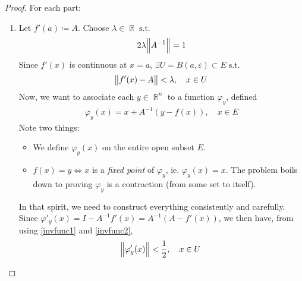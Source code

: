 \documentclass{amsart} %
\theoremstyle{mytheoremstyle}
\theoremstyle{definition}
\numberwithin{equation}{section}
\DeclareMathOperator{\R}{\mathbb{R}}
\DeclareMathOperator{\1}{\mathbbm{1}}
\DeclareMathOperator{\suchthat}{\text{ s.t. }}
\begin{document}
\begin{proof}
	For each part:
	\begin{enumerate}[label=(\arabic*)]
		\item Let $f'(a) \coloneqq A$. Choose $\lambda \in \R \suchthat $
		\begin{align}
		\label{invfunc1}
		2 \lambda \norm{A^{-1}} = 1
		\end{align}
		Since $f'(x)$ is continuous at $x=a$, $\exists U=B(a,\varepsilon) \subset E \suchthat $
		\begin{align}
		\label{invfunc2}
		\norm{f'(x)- A} < \lambda, \quad x \in U 
		\end{align}
		Now, we want to associate each $y \in \R^n$ to a function $\varphi_y$, defined
		\begin{align}
		\label{invfunc3}		
		\varphi_y (x) = x + A^{-1} (y-f(x)), \quad x \in E
		\end{align}
		Note two things:
		\begin{itemize}
			\item We define $\varphi_y (x)$ on the entire open subset $E$.
			\item $f(x) =y \iff x$ is a \textit{fixed point} of $\varphi_y$, ie. $\varphi_y(x)= x$. The problem boils down to proving $\varphi_y $ is a contraction (from some set to itself).
		\end{itemize}
		
		In that spirit, we need to construct everything consistently and carefully. Since $\varphi'_y (x) = I - A^{-1} f'(x) = A^{-1} (A - f'(x))$, we then have, from using \eqref{invfunc1} and \eqref{invfunc2},
		\begin{align}
		\label{invfunc4}
		\norm{\varphi'_y(x)} < \frac{1}{2}, \quad x \in U
		\end{align}
		

\end{enumerate}
\end{proof}
\end{document}

